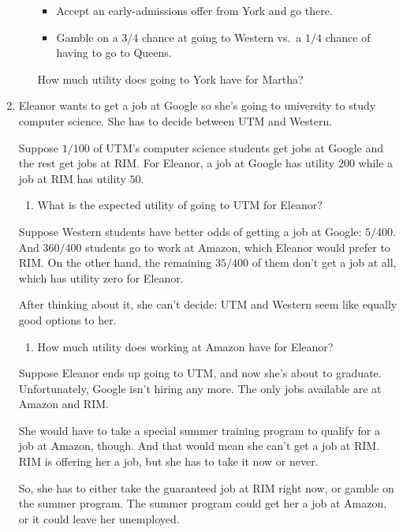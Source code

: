 \documentclass[justified]{tufte-book}
\providecommand{\tightlist}{%
  \setlength{\itemsep}{0pt}\setlength{\parskip}{0pt}}
\theoremstyle{definition}
\theoremstyle{definition}
\theoremstyle{definition}
\theoremstyle{definition}
\theoremstyle{remark}
\begin{document}
\begin{enumerate}
\begin{enumerate}
    \begin{itemize}
    \tightlist
    \item
      Accept an early-admissions offer from York and go there.
    \item
      Gamble on a \(3/4\) chance at going to Western vs.~a \(1/4\) chance of having to go to Queens.
    \end{itemize}

    How much utility does going to York have for Martha?
  \end{enumerate}
\item
  Eleanor wants to get a job at Google so she's going to university to study computer science. She has to decide between UTM and Western.

  Suppose \(1/100\) of UTM's computer science students get jobs at Google and the rest get jobs at RIM. For Eleanor, a job at Google has utility \(200\) while a job at RIM has utility \(50\).

  \begin{enumerate}
  \def\labelenumii{\alph{enumii}.}
  \tightlist
  \item
    What is the expected utility of going to UTM for Eleanor?
  \end{enumerate}

  Suppose Western students have better odds of getting a job at Google: \(5/400\). And \(360/400\) students go to work at Amazon, which Eleanor would prefer to RIM. On the other hand, the remaining \(35/400\) of them don't get a job at all, which has utility zero for Eleanor.

  After thinking about it, she can't decide: UTM and Western seem like equally good options to her.

  \begin{enumerate}
  \def\labelenumii{\alph{enumii}.}
  \setcounter{enumii}{1}
  \tightlist
  \item
    How much utility does working at Amazon have for Eleanor?
  \end{enumerate}

  Suppose Eleanor ends up going to UTM, and now she's about to graduate. Unfortunately, Google isn't hiring any more. The only jobs available are at Amazon and RIM.

  She would have to take a special summer training program to qualify for a job at Amazon, though. And that would mean she can't get a job at RIM. RIM is offering her a job, but she has to take it now or never.

  So, she has to either take the guaranteed job at RIM right now, or gamble on the summer program. The summer program could get her a job at Amazon, or it could leave her unemployed.


\end{enumerate}
\end{document}
